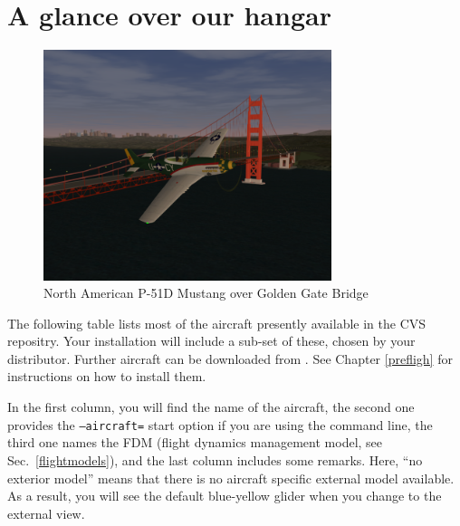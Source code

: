 \section{A glance over our hangar}\label{hangar}

\begin{figure}[!htp]
\centering
\includegraphics[width=0.75\textwidth]{img/p51.png}
\caption{North American P-51D Mustang over Golden Gate Bridge\label{P51}}
\end{figure}

The following table lists most of the aircraft presently available in the 
\FlightGear{} CVS repositry.
Your installation will include a sub-set of these, chosen by your distributor. 
Further aircraft can be downloaded from 
. See Chapter \ref{prefligh} 
for instructions on how to install them.

In the first column, you will find the name of the aircraft, the second one provides
the \texttt{--aircraft=} start option if you are using the command line, the third 
one names the FDM (flight dynamics management model, see Sec.~\ref{flightmodels}), 
and the last column includes some remarks. Here, ``no exterior model'' means that 
there is no aircraft specific external model available. As a result, you will see 
the default blue-yellow glider when you change to the external view. 


\noindent
{\scriptsize

}


